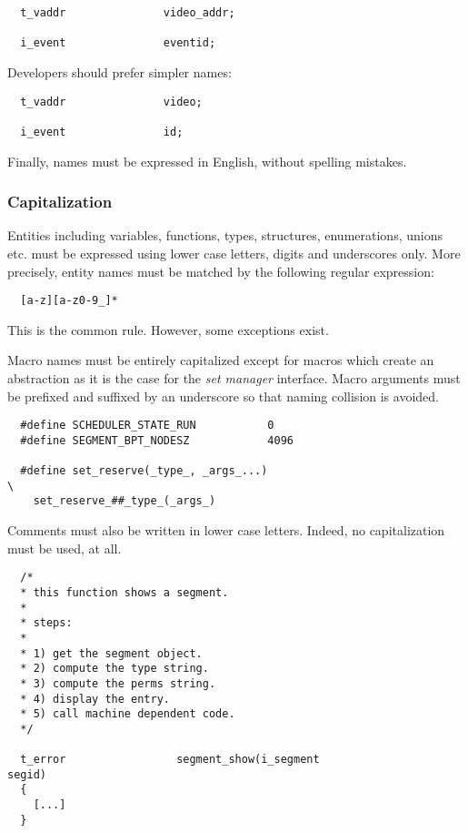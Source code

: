 \begin{verbatim}
  t_vaddr               video_addr;

  i_event               eventid;
\end{verbatim}

Developers should prefer simpler names:

\begin{verbatim}
  t_vaddr               video;

  i_event               id;
\end{verbatim}

Finally, names must be expressed in English, without spelling mistakes.


\subsubsection{Capitalization}

Entities including variables, functions, types, structures, enumerations,
unions etc. must be expressed using lower case letters, digits and underscores
only. More precisely, entity names must be matched by the following
regular expression:

\begin{verbatim}
  [a-z][a-z0-9_]*
\end{verbatim}

This is the common rule. However, some exceptions exist.

Macro names must be entirely capitalized except for macros which create
an abstraction as it is the case for the \textit{set manager} interface. Macro
arguments must be prefixed and suffixed by an underscore so that naming
collision is avoided.

\begin{verbatim}
  #define SCHEDULER_STATE_RUN           0
  #define SEGMENT_BPT_NODESZ            4096

  #define set_reserve(_type_, _args_...)                                \
    set_reserve_##_type_(_args_)
\end{verbatim}

Comments must also be written in lower case letters. Indeed, no capitalization
must be used, at all.

\begin{verbatim}
  /*
  * this function shows a segment.
  *
  * steps:
  *
  * 1) get the segment object.
  * 2) compute the type string.
  * 3) compute the perms string.
  * 4) display the entry.
  * 5) call machine dependent code.
  */

  t_error                 segment_show(i_segment                  segid)
  {
    [...]
  }
\end{verbatim}

